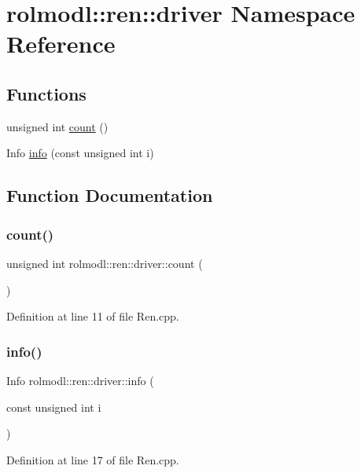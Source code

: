 \hypertarget{namespacerolmodl_1_1ren_1_1driver}{}\section{rolmodl\+::ren\+::driver Namespace Reference}
\label{namespacerolmodl_1_1ren_1_1driver}
\subsection*{Functions}
\begin{DoxyCompactItemize}
\item 
unsigned int \mbox{\hyperlink{namespacerolmodl_1_1ren_1_1driver_a22bd22bcde2f3a25868fb61df840e36c}{count}} ()
\item 
Info \mbox{\hyperlink{namespacerolmodl_1_1ren_1_1driver_aa51e77f4478a9f134a63770286b3c6e5}{info}} (const unsigned int i)
\end{DoxyCompactItemize}


\subsection{Function Documentation}
\mbox{\label{namespacerolmodl_1_1ren_1_1driver_a22bd22bcde2f3a25868fb61df840e36c}} 
\subsubsection{\texorpdfstring{count()}{count()}}
{\footnotesize\ttfamily unsigned int rolmodl\+::ren\+::driver\+::count (\begin{DoxyParamCaption}{ }\end{DoxyParamCaption})}



Definition at line 11 of file Ren.\+cpp.

\mbox{\label{namespacerolmodl_1_1ren_1_1driver_aa51e77f4478a9f134a63770286b3c6e5}} 
\subsubsection{\texorpdfstring{info()}{info()}}
{\footnotesize\ttfamily Info rolmodl\+::ren\+::driver\+::info (\begin{DoxyParamCaption}\item[{const unsigned int}]{i }\end{DoxyParamCaption})}



Definition at line 17 of file Ren.\+cpp.

